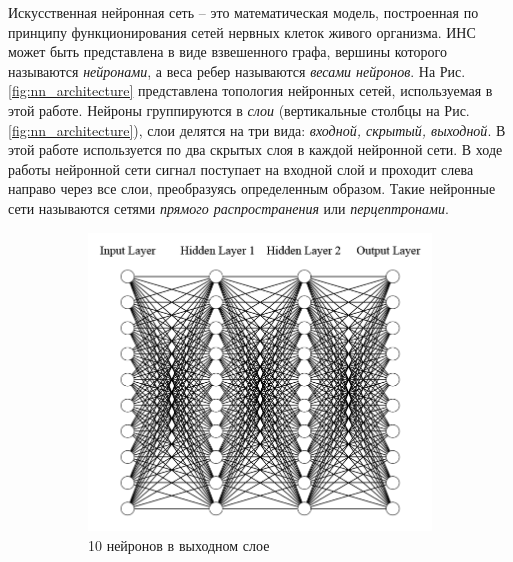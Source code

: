 \documentclass[a4paper,12pt]{article}
\theoremstyle{remark}
\begin{document}
	Искусственная нейронная сеть -- это математическая модель, построенная по принципу функционирования сетей нервных клеток живого организма. ИНС может быть представлена в виде взвешенного графа, вершины которого называются \textit{нейронами}, а веса ребер называются \textit{весами нейронов}. На Рис. \ref{fig:nn_architecture} представлена топология нейронных сетей, используемая в этой работе. Нейроны группируются в \textit{слои} (вертикальные столбцы на Рис. \ref{fig:nn_architecture}), слои делятся на три вида: \textit{входной, скрытый, выходной}. В этой работе используется по два скрытых слоя в каждой нейронной сети. В ходе работы нейронной сети сигнал поступает на входной слой и проходит слева направо через все слои, преобразуясь определенным образом. Такие нейронные сети называются сетями \textit{прямого распространения} или \textit{перцептронами}.
	\begin{figure}[h]
		\begin{subfigure}{0.5\textwidth}
			\includegraphics[width=\linewidth]{nn_architecture1.png}
			\caption{10 нейронов в выходном слое}
		\end{subfigure}
		\begin{subfigure}{0.5\textwidth}

\end{subfigure}
\end{figure}
\end{document}
